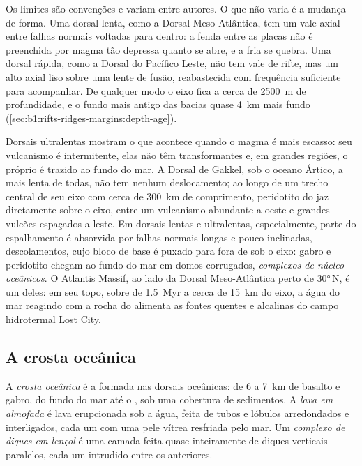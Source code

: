 Os limites são convenções e variam entre autores. O que não varia é a mudança de forma. Uma dorsal lenta, como a Dorsal Meso-Atlântica, tem um vale axial entre falhas normais voltadas para dentro: a fenda entre as placas não é preenchida por magma tão depressa quanto se abre, e a  fria se quebra. Uma dorsal rápida, como a Dorsal do Pacífico Leste, não tem vale de rifte, mas um alto axial liso sobre uma lente de fusão, reabastecida com frequência suficiente para acompanhar.
De qualquer modo o eixo fica a cerca de \qty{2500}{m} de profundidade, e o fundo mais antigo das bacias quase \qty{4}{km} mais fundo (\cref{sec:b1:rifts-ridges-margins:depth-age}).

Dorsais ultralentas mostram o que acontece quando o magma é mais escasso: seu vulcanismo é intermitente, elas não têm transformantes e, em grandes regiões, o próprio  é trazido ao fundo do mar. A Dorsal de Gakkel, sob o oceano Ártico, a mais lenta de todas, não tem nenhum deslocamento; ao longo de um trecho central de seu eixo com cerca de \qty{300}{km} de comprimento, peridotito do  jaz diretamente sobre o eixo, entre um vulcanismo abundante a oeste e grandes vulcões espaçados a leste.
Em dorsais lentas e ultralentas, especialmente, parte do espalhamento é absorvida por falhas normais longas e pouco inclinadas, descolamentos, cujo bloco de base é puxado para fora de sob o eixo: gabro e peridotito chegam ao fundo do mar em domos corrugados, \emph{complexos de núcleo oceânicos}. O Atlantis Massif, ao lado da Dorsal Meso-Atlântica perto de \ang{30}\,N, é um deles: em seu topo, sobre  de \qty{1.5}{Myr} a cerca de \qty{15}{km} do eixo, a água do mar reagindo com a rocha do  alimenta as fontes quentes e alcalinas do campo hidrotermal Lost City.

\subsection*{A crosta oceânica}

\begin{definition}\label{def:b1:rifts-ridges-margins:oceanic-crust}
A \emph{crosta oceânica} é a  formada nas dorsais oceânicas: de 6 a \qty{7}{km} de basalto e gabro, do fundo do mar até o , sob uma cobertura de sedimentos.
A \emph{lava em almofada} é lava erupcionada sob a água, feita de tubos e lóbulos arredondados e interligados, cada um com uma pele vítrea resfriada pelo mar. Um \emph{complexo de diques em lençol} é uma camada feita quase inteiramente de diques verticais paralelos, cada um intrudido entre os anteriores.
\end{definition}

